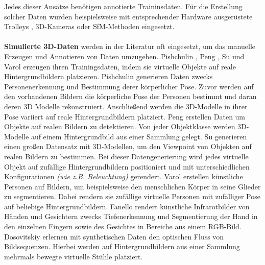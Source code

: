 Jedes dieser Ansätze benötigen annotierte Traininsdaten. Für die Erstellung solcher Daten wurden beispielsweise mit entsprechender Hardware ausgerüstete Trolleys \cite{huitlTUMindoorExtensiveImage2012}, 3D-Kameras \cite{izadiKinectFusionRealtime3D2011} oder SfM-Methoden \cite{kendallPoseNetConvolutionalNetwork2015} eingesetzt.
\\\\
\textbf{Simulierte 3D-Daten} werden in der Literatur oft eingesetzt, um das manuelle Erzeugen und Annotieren von Daten umzugehen. Pishchulin \etal\cite{pishchulinArticulatedPeopleDetection2012a}, Peng \etal\cite{pengLearningDeepObject2014}, Su \etal\cite{suRenderCNNViewpoint2015} und Varol \etal\cite{varolLearningSyntheticHumans2017} erzeugen ihren Trainingsdaten, indem sie virtuelle Objekte auf reale Hintergrundbildern platzieren. Pishchulin \etal\cite{pishchulinArticulatedPeopleDetection2012a} generieren Daten zwecks Personenerkennung und Bestimmung derer körperlicher Pose. Zuvor werden auf den vorhandenen Bildern die körperliche Pose der Personen bestimmt und daran deren 3D Modelle rekonstruiert. Anschließend werden die 3D-Modelle in ihrer Pose variiert auf reale Hintergrundbildern platziert. Peng \etal\cite{pengLearningDeepObject2014} erstellen Daten um Objekte auf realen Bildern zu detektieren. Von jeder Objektklasse werden 3D-Modelle auf einem Hintergrundbild aus einer Sammlung gelegt. Su \etal\cite{suRenderCNNViewpoint2015} generieren einen großen Datensatz mit 3D-Modellen, um den Viewpoint von Objekten auf realen Bildern zu bestimmen. Bei dieser Datengenerierung wird jedes virtuelle Objekt auf zufällige Hintergrundbildern positioniert und mit unterschiedlichen Konfigurationen \textit{(wie z.B. Beleuchtung)} gerendert. 
Varol \etal\cite{varolLearningSyntheticHumans2017} erstellen künstliche Personen auf Bildern, um beispielsweise den menschlichen Körper in seine Glieder zu segmentieren. Dabei rendern sie zufällige virtuelle Personen mit zufälliger Pose auf beliebige Hintergrundbildern.
Fanello \etal\cite{fanelloLearningBeDepth2014} rendert künstliche Infrarotbilder von Händen und Gesichtern zwecks Tiefenerkennung und Segmentierung der Hand in den einzelnen Fingern sowie des Gesichtes in Bereiche aus einem RGB-Bild.
Dosovitskiy \etal\cite{dosovitskiyFlowNetLearningOptical2015} erlernen mit synthetischen Daten den optischen Fluss von Bildsequenzen.  Hierbei werden auf Hintergrundbildern aus einer Sammlung mehrmals bewegte virtuelle Stühle platziert.


